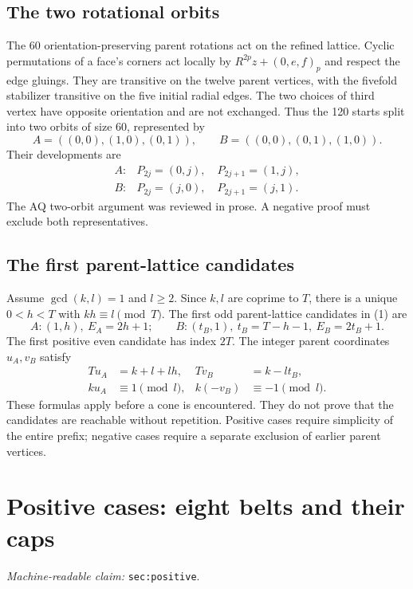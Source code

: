 \documentclass[11pt]{amsart}
\newcommand{\record}[1]{\nolinkurl{#1}}
\newcommand{\claimid}[1]{\par\nopagebreak\noindent\textit{Machine-readable claim:} \record{#1}.\par}
\begin{document}
\subsection{The two rotational orbits}
The 60 orientation-preserving parent rotations act on the refined
lattice. Cyclic permutations of a face's corners act locally by
$R^{2p}z+(0,e,f)_p$ and respect the edge gluings. They are transitive
on the twelve parent vertices, with the fivefold stabilizer transitive
on the five initial radial edges. The two choices of third vertex have
opposite orientation and are not exchanged. Thus the 120 starts split
into two orbits of size 60, represented by
\[
 A=((0,0),(1,0),(0,1)),\qquad B=((0,0),(0,1),(1,0)).
\]
Their developments are
\begin{equation}\label{eq:3}
\begin{array}{ll}
 A: & P_{2j}=(0,j),\quad P_{2j+1}=(1,j),\\
 B: & P_{2j}=(j,0),\quad P_{2j+1}=(j,1).
\end{array}\tag{3}
\end{equation}
The AQ two-orbit argument was reviewed in prose. A negative proof must
exclude both representatives.

\subsection{The first parent-lattice candidates}
Assume $\gcd(k,l)=1$ and $l\ge2$. Since $k,l$ are coprime to $T$,
there is a unique $0<h<T$ with $kh\equiv l\pmod T$. The first odd
parent-lattice candidates in (1) are
\begin{equation}\label{eq:4}
 A:(1,h),\ E_A=2h+1;\qquad
 B:(t_B,1),\ t_B=T-h-1,\ E_B=2t_B+1.\tag{4}
\end{equation}
The first positive even candidate has index $2T$. The integer parent
coordinates $u_A,v_B$ satisfy
\begin{equation}\label{eq:5}
\begin{aligned}
 Tu_A&=k+l+lh,& Tv_B&=k-lt_B,\\
 ku_A&\equiv1\pmod l,& k(-v_B)&\equiv-1\pmod l.
\end{aligned}\tag{5}
\end{equation}
These formulas apply before a cone is encountered. They do not prove
that the candidates are reachable without repetition. Positive cases
require simplicity of the entire prefix; negative cases require a
separate exclusion of earlier parent vertices.

\section{Positive cases: eight belts and their caps}\label{sec:positive}
\claimid{sec:positive}
\end{document}
